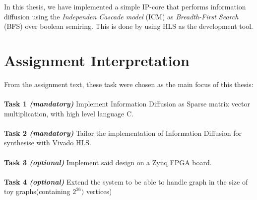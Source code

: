 In this thesis, we have implemented a simple IP-core that performs information diffusion using the \textit{Independen Cascade model} (ICM) as \textit{Breadth-First Search} (BFS) over boolean semiring. This is done by using HLS as the development tool. 


\section{Assignment Interpretation}
From the assignment text, these task were chosen as the main focus of this thesis:\\ \hfil \\ \hfil
\textbf{Task 1 \textit{(mandatory)}} Implement Information Diffusion as Sparse matrix vector multiplication, with high level language C.  \\ \hfil \\ \hfil
\textbf{Task 2 \textit{(mandatory)}} Tailor the implementation of Information Diffusion for synthesise with Vivado HLS.   \\ \hfil \\ \hfil
\textbf{Task 3 \textit{(optional)}} Implement said design on a  Zynq FPGA board. \\ \hfil \\ \hfil
\textbf{Task 4 \textit{(optional)}} Extend the system to be able to handle graph in the size of toy graphs(containing $2^{26})$ vertices) \\ \hfil \\ \hfil



